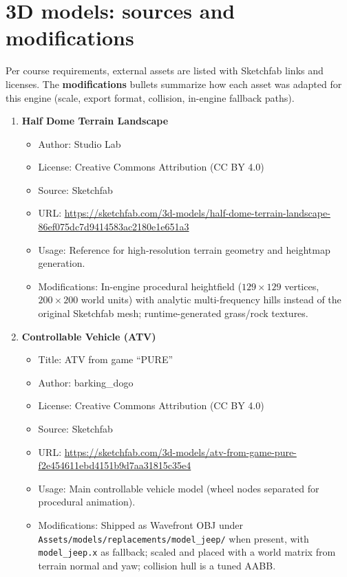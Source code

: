 \documentclass[11pt,a4paper]{article}
\begin{document}
\section{3D models: sources and modifications}
\label{sec:models}

Per course requirements, external assets are listed with Sketchfab links and licenses. The \textbf{modifications} bullets summarize how each asset was adapted for this engine (scale, export format, collision, in-engine fallback paths).

\begingroup
\sloppy
\setlength{\emergencystretch}{4em}

\begin{enumerate}
  \item \textbf{Half Dome Terrain Landscape}
    \begin{itemize}\setlength\itemsep{2pt}\setlength\parskip{0pt}
      \item Author: Studio Lab
      \item License: Creative Commons Attribution (CC BY 4.0)
      \item Source: Sketchfab
      \item URL: \url{https://sketchfab.com/3d-models/half-dome-terrain-landscape-86ef075dc7d9414583ac2180e1e651a3}
      \item Usage: Reference for high-resolution terrain geometry and heightmap generation.
      \item Modifications: In-engine procedural heightfield ($129\times 129$ vertices, $200\times 200$ world units) with analytic multi-frequency hills instead of the original Sketchfab mesh; runtime-generated grass/rock textures.
    \end{itemize}

  \item \textbf{Controllable Vehicle (ATV)}
    \begin{itemize}\setlength\itemsep{2pt}\setlength\parskip{0pt}
      \item Title: ATV from game ``PURE''
      \item Author: barking\_dogo
      \item License: Creative Commons Attribution (CC BY 4.0)
      \item Source: Sketchfab
      \item URL: \url{https://sketchfab.com/3d-models/atv-from-game-pure-f2e454611ebd4151b9d7aa31815c35e4}
      \item Usage: Main controllable vehicle model (wheel nodes separated for procedural animation).
      \item Modifications: Shipped as Wavefront OBJ under \texttt{Assets/models/replacements/model\_jeep/} when present, with \texttt{model\_jeep.x} as fallback; scaled and placed with a world matrix from terrain normal and yaw; collision hull is a tuned AABB.
    \end{itemize}


\end{enumerate}
\end{document}
